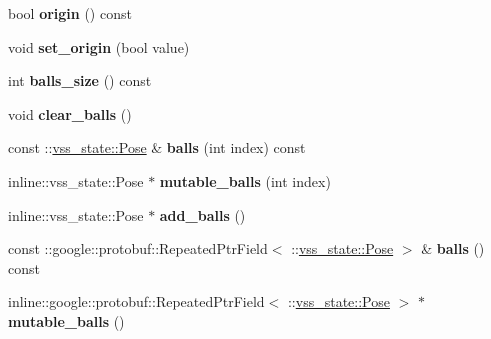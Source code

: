 \begin{DoxyCompactItemize}
\item 
bool {\bfseries origin} () const \hypertarget{classvss__state_1_1Global__State_a5b09a31922fe8f976a7e21f2279a1364}{}\label{classvss__state_1_1Global__State_a5b09a31922fe8f976a7e21f2279a1364}

\item 
void {\bfseries set\+\_\+origin} (bool value)\hypertarget{classvss__state_1_1Global__State_ac88223b795690cc57a71f24b315352fc}{}\label{classvss__state_1_1Global__State_ac88223b795690cc57a71f24b315352fc}

\item 
int {\bfseries balls\+\_\+size} () const \hypertarget{classvss__state_1_1Global__State_a5010e0f86563f07ce75ed2138de96ae5}{}\label{classvss__state_1_1Global__State_a5010e0f86563f07ce75ed2138de96ae5}

\item 
void {\bfseries clear\+\_\+balls} ()\hypertarget{classvss__state_1_1Global__State_a738a0947e2c3a450614579e1b7c008e4}{}\label{classvss__state_1_1Global__State_a738a0947e2c3a450614579e1b7c008e4}

\item 
const \+::\hyperlink{classvss__state_1_1Pose}{vss\+\_\+state\+::\+Pose} \& {\bfseries balls} (int index) const \hypertarget{classvss__state_1_1Global__State_ac9ebe4e5aab2aa2dfba8591cf0d167f9}{}\label{classvss__state_1_1Global__State_ac9ebe4e5aab2aa2dfba8591cf0d167f9}

\item 
inline\+::vss\+\_\+state\+::\+Pose $\ast$ {\bfseries mutable\+\_\+balls} (int index)\hypertarget{classvss__state_1_1Global__State_a7e5618be7c467adf24da26ea8bcc4c7d}{}\label{classvss__state_1_1Global__State_a7e5618be7c467adf24da26ea8bcc4c7d}

\item 
inline\+::vss\+\_\+state\+::\+Pose $\ast$ {\bfseries add\+\_\+balls} ()\hypertarget{classvss__state_1_1Global__State_a380f07c13139fdd9139b89c8dfc703f3}{}\label{classvss__state_1_1Global__State_a380f07c13139fdd9139b89c8dfc703f3}

\item 
const \+::google\+::protobuf\+::\+Repeated\+Ptr\+Field$<$ \+::\hyperlink{classvss__state_1_1Pose}{vss\+\_\+state\+::\+Pose} $>$ \& {\bfseries balls} () const \hypertarget{classvss__state_1_1Global__State_ae0af9762584ebb416c0ffea67408a4d3}{}\label{classvss__state_1_1Global__State_ae0af9762584ebb416c0ffea67408a4d3}

\item 
inline\+::google\+::protobuf\+::\+Repeated\+Ptr\+Field$<$ \+::\hyperlink{classvss__state_1_1Pose}{vss\+\_\+state\+::\+Pose} $>$ $\ast$ {\bfseries mutable\+\_\+balls} ()\hypertarget{classvss__state_1_1Global__State_ae7cb337b3ec2c9a90574994de8f95aa1}{}\label{classvss__state_1_1Global__State_ae7cb337b3ec2c9a90574994de8f95aa1}


\end{DoxyCompactItemize}
